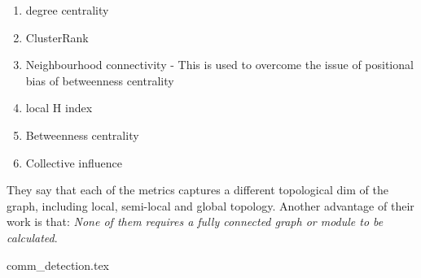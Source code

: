 \begin{enumerate}
    \item degree centrality 
    \item ClusterRank
    \item Neighbourhood connectivity - This is used to overcome the issue of positional bias of betweenness centrality
    \item local H index
    \item Betweenness centrality  
    \item Collective influence 
\end{enumerate}


They say that each of the metrics captures a different topological dim of the graph, including local, semi-local and global topology. Another advantage of their work is that: \textit{None of them requires a fully connected graph or module to be calculated}.


{comm_detection.tex}



\newpage


 


